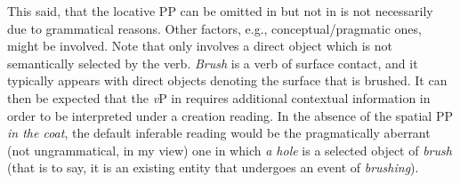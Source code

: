\documentclass[output=paper,colorlinks,citecolor=brown]{langscibook}
\begin{document}
\noindent This said, that the locative PP can be omitted in  but not in  is not necessarily due to grammatical reasons. Other factors, e.g., conceptual/pragmatic ones, might be involved. %
Note that only  involves a direct object which is not semantically selected by the verb. %
\textit{Brush} is a verb of surface contact, and it typically appears with direct objects denoting the surface that is brushed. %
It can then be expected that the \textit{v}P in  requires additional contextual information in order to be interpreted under a creation reading. %
In the absence of the spatial PP \textit{in the coat}, the default inferable reading would be the pragmatically aberrant (not ungrammatical, in my view) one in which \textit{a hole} is a selected object of \textit{brush} (that is to say, it is an existing entity that undergoes an event of \textit{brushing}). %
\end{document}
